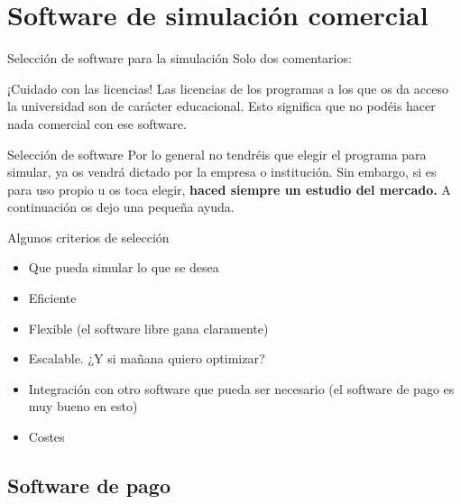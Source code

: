 \documentclass[12pt]{beamer}
\begin{document}
\section{Software de simulación comercial}

\begin{frame}{Selección de software para la simulación}
	Solo dos comentarios:
	\begin{block}{¡Cuidado con las licencias!}
		Las licencias de los programas a los que os da acceso la universidad son de carácter educacional. Esto significa que no podéis hacer nada comercial con ese software.
	\end{block}
	\pause
	\begin{block}{Selección de software}
		Por lo general no tendréis que elegir el programa para simular, ya os vendrá dictado por la empresa o institución. Sin embargo, si es para uso propio u os toca elegir, \textbf{haced siempre un estudio del mercado.} A continuación os dejo una pequeña ayuda.
	\end{block}
\end{frame}

\begin{frame}{Algunos criterios de selección}
	\begin{itemize}[label=$\checkmark$]
		\item Que pueda simular lo que se desea
		\item Eficiente
		\item Flexible (el software libre gana claramente)
		\item Escalable. ¿Y si mañana quiero optimizar?
		\item Integración con otro software que pueda ser necesario (el software de pago es muy bueno en esto)
		\item Costes
	\end{itemize}
\end{frame}

\subsection{Software de pago}
\end{document}
